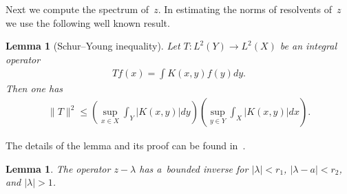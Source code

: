\documentclass[11pt]{article}
\numberwithin{equation}{section}
\newtheorem{Lemma}[Theorem]{Lemma}
\begin{document}
Next we compute the spectrum of~$z$.
In estimating the norms of resolvents of~$z$ we use the following well known result.

\begin{Lemma}[Schur--Young inequality]
\label{schuryounginq}
Let $T: L^2(Y) \longrightarrow L^2(X)$ be an integral operator
\begin{gather*}
Tf(x)=\int K(x,y)f(y)dy.
\end{gather*}
Then one has
\begin{gather*}
\|T\|^2 \le \left(\sup_{x\in X} \int_Y |K(x,y)|dy\right)\left(\sup_{y\in Y} \int_X |K(x,y)|dx\right).
\end{gather*}
\end{Lemma}

The details of the lemma and its proof can be found in~\cite{HS}.

\begin{Lemma}
\label{resolvent_of_z}
The operator $z-\lambda$ has a~bounded inverse for $|\lambda|< r_1$, $|\lambda-a|< r_2$, and $|\lambda|>1$.
\end{Lemma}
\end{document}
